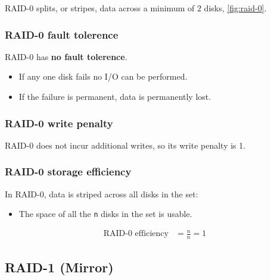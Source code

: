 \documentclass[slides]{pgnotes}
\begin{document}
\begin{minipage}{0.6\linewidth}

RAID-0 splits, or stripes, data across a minimum of $2$ disks, \autoref{fig:raid-0}.
  
\subsubsection{RAID-0 fault tolerence}
\label{sec:raid-0-fault-tolerence}

RAID-0 has \textbf{no fault tolerence}.
\begin{itemize}
\item If any one disk fails no I/O can be performed.
\item If the failure is permanent, data is permanently lost.
\end{itemize}


\subsubsection{RAID-0 write penalty}
\label{sec:raid-0-write-penalty}

RAID-0 does not incur additional writes, so its write penalty is 1.


\end{minipage}
\begin{minipage}{0.39\linewidth}
\end{minipage}

\newpage
\subsubsection{RAID-0 storage efficiency}
\label{sec:raid-0-storage-efficiency}

In RAID-0, data is striped across all disks in the set:
\begin{itemize}
  \item The space of all the \texttt{n} disks in the set is usable.
\end{itemize}

\begin{align}
  \mbox{RAID-0 efficiency} & = \frac{n}{n} = 1 \label{eq:raid-0-storage-efficiency}
\end{align}




\subsection{RAID-1 (Mirror)}
\label{sec:raid-1}
\end{document}
